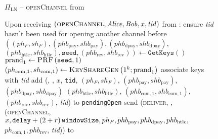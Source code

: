   \begin{figure}[H]
    \begin{protocolbox}{$\Pi_{\mathrm{LN}}$ -- \textsc{openChannel} from
    \environment}
      \begin{algorithmic}[1]
        \State Upon receiving $\left(\textsc{openChannel}, \mathit{Alice}, \mathit{Bob}, x,
        \mathit{tid}\right)$ from \environment:
        \Indent
          \State ensure \textit{tid} hasn't been used for opening another
          channel before
          \label{alg:protocol:open:env:valid}
          \State $\left(\left(ph_F, sh_F\right), \left(phb_{\mathrm{pay}},
          shb_{\mathrm{pay}}\right), \left(phb_{\mathrm{dpay}},
          shb_{\mathrm{dpay}}\right),\right.$ $\left.\left(phb_{\mathrm{htlc}},
          shb_{\mathrm{htlc}}\right), \mathtt{seed}, \left(phb_{\mathrm{rev}},
          shb_{\mathrm{rev}}\right)\right) \gets \texttt{GetKeys}\left(\right)$
          \State $\mathrm{prand}_1 \gets \textsc{PRF}\left(\mathtt{seed},
          1\right)$
          \label{alg:protocol:open:env:prf}
          \State $\left(ph_{\mathrm{com}, 1}, sh_{\mathrm{com}, 1}\right) \gets
          \textsc{KeyShareGen}\left(1^k; \mathrm{prand}_1\right)$
          \State associate keys with \textit{tid}
          \State add (\alice, \bob, $x$, \texttt{tid}, $(ph_F, sh_F)$,
          $(phb_{\mathrm{pay}}, shb_{\mathrm{pay}})$, $(phb_{\mathrm{dpay}},
          shb_{\mathrm{dpay}})$ $(phb_{\mathrm{htlc}}, shb_{\mathrm{htlc}})$,
          $(phb_{\mathrm{com}, 1}, shb_{\mathrm{com}, 1})$,
          $(phb_{\mathrm{rev}}, shb_{\mathrm{rev}})$, \textit{tid}) to
          \texttt{pendingOpen}
          \label{alg:protocol:open:env:pendingOpen}
          \State send (\textsc{deliver}, \bob, (\textsc{openChannel}, $x,
          \mathtt{delay} + \left(2 + r\right)\texttt{windowSize}, ph_F, phb_{\mathrm{pay}},
          phb_{\mathrm{dpay}}, phb_{\mathrm{htlc}},$ $ph_{\mathrm{com}, 1},
          phb_{\mathrm{rev}}$, \textit{tid})) to \fanon
        \EndIndent
      \end{algorithmic}
    \end{protocolbox}
    \caption{}
    \label{alg:protocol:open:env}
  \end{figure}


